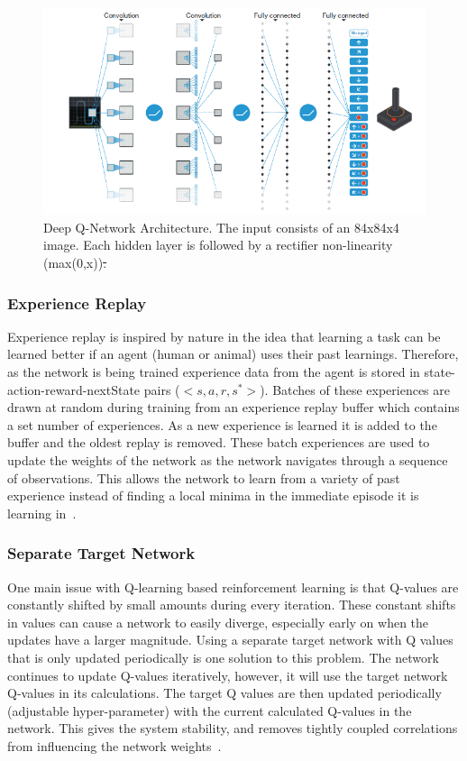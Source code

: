 \documentclass[12pt,american]{report}
\providecommand{\DIFaddtex}[1]{{\protect\color{blue}\uwave{#1}}} %
\providecommand{\DIFdeltex}[1]{{\protect\color{red}\sout{#1}}}                      %
\providecommand{\DIFaddFL}[1]{\DIFadd{#1}} %
\providecommand{\DIFdelFL}[1]{\DIFdel{#1}} %
\providecommand{\DIFaddbeginFL}{} %
\providecommand{\DIFaddendFL}{} %
\providecommand{\DIFdelbeginFL}{} %
\providecommand{\DIFdelendFL}{} %
\providecommand{\DIFadd}[1]{\texorpdfstring{\DIFaddtex{#1}}{#1}} %
\providecommand{\DIFdel}[1]{\texorpdfstring{\DIFdeltex{#1}}{}} %
\newcommand{\DIFscaledelfig}{0.5}
\newlength{\DIFdelgraphicswidth} %
\newlength{\DIFdelgraphicsheight} %
\newcommand{\DIFaddincludegraphics}[2][]{{\color{blue}\fbox{\DIFOincludegraphics[#1]{#2}}}} %
\newcommand{\DIFdelincludegraphics}[2][]{%
\sbox{\DIFdelgraphicsbox}{\DIFOincludegraphics[#1]{#2}}%
\settoboxwidth{\DIFdelgraphicswidth}{\DIFdelgraphicsbox} %
\settoboxtotalheight{\DIFdelgraphicsheight}{\DIFdelgraphicsbox} %
\scalebox{\DIFscaledelfig}{%
\parbox[b]{\DIFdelgraphicswidth}{\usebox{\DIFdelgraphicsbox}\\[-\baselineskip] \rule{\DIFdelgraphicswidth}{0em}}\llap{\resizebox{\DIFdelgraphicswidth}{\DIFdelgraphicsheight}{%
\setlength{\unitlength}{\DIFdelgraphicswidth}%
\begin{picture}(1,1)%
\thicklines\linethickness{2pt} %
{\color[rgb]{1,0,0}\put(0,0){\framebox(1,1){}}}%
{\color[rgb]{1,0,0}\put(0,0){\line( 1,1){1}}}%
{\color[rgb]{1,0,0}\put(0,1){\line(1,-1){1}}}%
\end{picture}%
}\hspace*{3pt}}} %
} %
\DeclareRobustCommand{\DIFaddbeginFL}{\DIFOaddbeginFL \let\includegraphics\DIFaddincludegraphics} %
\DeclareRobustCommand{\DIFaddendFL}{\DIFOaddendFL \let\includegraphics\DIFOincludegraphics} %
\DeclareRobustCommand{\DIFdelbeginFL}{\DIFOdelbeginFL \let\includegraphics\DIFdelincludegraphics} %
\DeclareRobustCommand{\DIFdelendFL}{\DIFOaddendFL \let\includegraphics\DIFOincludegraphics} %
\begin{document}
\begin{figure}
\centering
\includegraphics[scale=.95]{images/DQN-atari.png}
\caption{Deep Q-Network Architecture. The input consists of an 84x84x4 image. Each hidden layer is followed by a rectifier non-linearity (max(0,x))\DIFdelbeginFL \DIFdelFL{.}\DIFdelendFL ~\cite{atari}\DIFaddbeginFL \DIFaddFL{.}\DIFaddendFL }
\label{fig:DQN-atari}
\end{figure}


\subsubsection{Experience Replay}

Experience replay is inspired by nature in the idea that learning a task can be learned better if an agent (human or animal) uses their past learnings.  Therefore, as the network is being trained experience data from the agent is stored in state-action-reward-nextState pairs ($<s,a,r,s^{*}>$). Batches of these experiences are drawn at random during training from an experience replay buffer which contains a set number of experiences.  As a new experience is learned it is added to the buffer and the oldest replay is removed. These batch experiences are used to update the weights of the network as the network navigates through a sequence of observations.  This allows the network to learn from a variety of past experience instead of finding a local minima in the immediate episode it is learning in~\cite{atari}.

\subsubsection{Separate Target Network}

One main issue with Q-learning based reinforcement learning is that Q-values are constantly shifted by small amounts during every iteration.  These constant shifts in values can cause a network to easily diverge, especially early on when the updates have a larger magnitude.  Using a separate target network with Q values that is only updated periodically is one solution to this problem.  The network continues to update Q-values iteratively, however, it will use the target network Q-values in its calculations.  The target Q values are then updated periodically (adjustable hyper-parameter) with the current calculated Q-values in the network.  This gives the system stability, and removes tightly coupled correlations from influencing the network weights~\cite{atari}.
\end{document}
